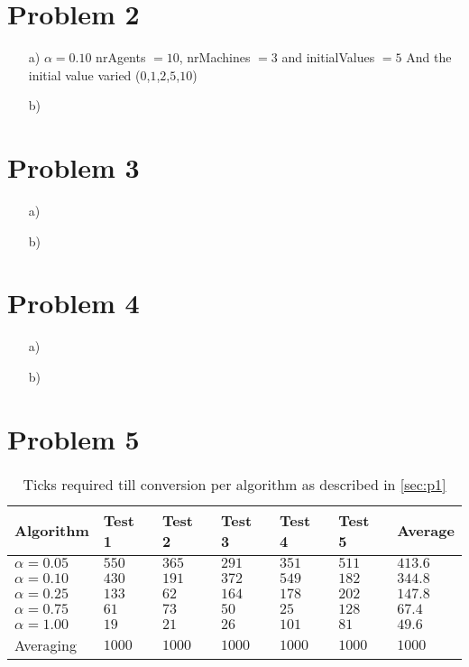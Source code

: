 \documentclass[12pt]{article}
\begin{document}
\section*{Problem 2}
\begin{enumerate}
	\item[a)]
	$\alpha = 0.10$
	nrAgents $= 10$, nrMachines $=3$ and initialValues $=5$
	And the initial value varied ($0$,$1$,$2$,$5$,$10$)



	\item[b)]
\end{enumerate}

\section*{Problem 3}

\begin{enumerate}
	\item[a)]
	\item[b)]
\end{enumerate}

\section*{Problem 4}

\begin{enumerate}
	\item[a)]
	\item[b)]
\end{enumerate}

\section*{Problem 5}




\begin{table}[]
\centering
\begin{tabular}{|l|l|l|l|l|l|l|}
\hline
Algorithm       & Test 1                   & Test 2 & Test 3 & Test 4 & Test 5 & Average  \\ \hline
$\alpha = 0.05$ & $550$         & $365$    & $291$    & $351$    & $511$    & $413.6$ 		\\ \hline
$\alpha = 0.10$ & $430$ 				& $191$    & $372$    & $549$    & $182$    & $344.8$ 		\\ \hline
$\alpha = 0.25$ & $133$         & $62$     & $164$    & $178$    & $202$    & $147.8$ 		\\ \hline
$\alpha = 0.75$ & $61$          & $73$     & $50$     & $25$     & $128$    & $67.4$      \\ \hline
$\alpha = 1.00$ & $19$          & $21$     & $26$     & $101$    & $81$     & $49.6$      \\ \hline
Averaging       & $1000$        & $1000$   & $1000$   & $1000$   & $1000$   & $1000$      \\ \hline
\end{tabular}
\caption{Ticks required till conversion per algorithm as described in \ref{sec:p1} }
\label{table:P1-comparisson}
\end{table}
\end{document}
